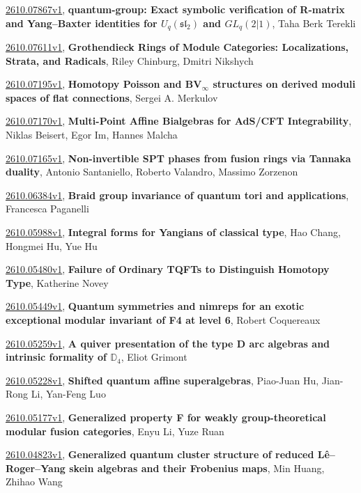 \documentclass[9pt, a4paper]{article}
\theoremstyle{plain}
\theoremstyle{definition}
\theoremstyle{remark}
\newcommand{\arxiv}[3]{\href{https://arxiv.org/abs/#1}{#1}, \textbf{\textcolor{arxivblue}{#2}}, #3}
\begin{document}
\arxiv{2610.07867v1}{quantum-group: Exact symbolic verification of R-matrix and Yang--Baxter identities for $U_q(\mathfrak{sl}_2)$ and $GL_q(2|1)$}{Taha Berk Terekli}

\arxiv{2610.07611v1}{Grothendieck Rings of Module Categories: Localizations, Strata, and Radicals}{Riley Chinburg, Dmitri Nikshych}

\arxiv{2610.07195v1}{Homotopy Poisson and BV$_\infty$ structures on derived moduli spaces of flat connections}{Sergei A. Merkulov}

\arxiv{2610.07170v1}{Multi-Point Affine Bialgebras for AdS/CFT Integrability}{Niklas Beisert, Egor Im, Hannes Malcha}

\arxiv{2610.07165v1}{Non-invertible SPT phases from fusion rings via Tannaka duality}{Antonio Santaniello, Roberto Valandro, Massimo Zorzenon}

\arxiv{2610.06384v1}{Braid group invariance of quantum tori and applications}{Francesca Paganelli}

\arxiv{2610.05988v1}{Integral forms for Yangians of classical type}{Hao Chang, Hongmei Hu, Yue Hu}

\arxiv{2610.05480v1}{Failure of Ordinary TQFTs to Distinguish Homotopy Type}{Katherine Novey}

\arxiv{2610.05449v1}{Quantum symmetries and nimreps for an exotic exceptional modular invariant of F4 at level 6}{Robert Coquereaux}

\arxiv{2610.05259v1}{A quiver presentation of the type D arc algebras and intrinsic formality of $\mathbb{D}_4$}{Eliot Grimont}

\arxiv{2610.05228v1}{Shifted quantum affine superalgebras}{Piao-Juan Hu, Jian-Rong Li, Yan-Feng Luo}

\arxiv{2610.05177v1}{Generalized property F for weakly group-theoretical modular fusion categories}{Enyu Li, Yuze Ruan}

\arxiv{2610.04823v1}{Generalized quantum cluster structure of reduced Lê--Roger--Yang skein algebras and their Frobenius maps}{Min Huang, Zhihao Wang}

\end{document}

